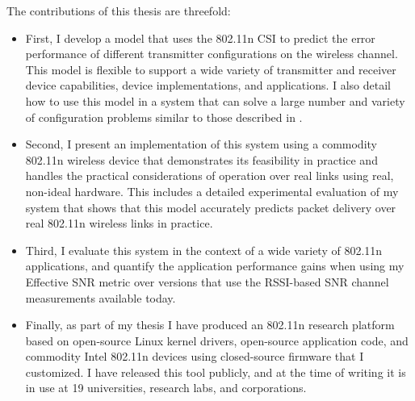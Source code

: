 The contributions of this thesis are threefold:
\begin{itemize}
\item First, I develop a model that uses the 802.11n CSI to predict the error performance of different transmitter configurations on the wireless channel. This model is flexible to support a wide variety of transmitter and receiver device capabilities, device implementations, and applications. I also detail how to use this model in a system that can solve a large number and variety of configuration problems similar to those described in .
\item Second, I present an implementation of this system using a commodity 802.11n wireless device that demonstrates its feasibility in practice and handles the practical considerations of operation over real links using real, non-ideal hardware. This includes a detailed experimental evaluation of my system that shows that this model accurately predicts packet delivery over real 802.11n wireless links in practice.
\item Third, I evaluate this system in the context of a wide variety of 802.11n applications, and quantify the application performance gains when using my Effective SNR metric over versions that use the RSSI-based SNR channel measurements available today.
\item Finally, as part of my thesis I have produced an 802.11n research platform based on open-source Linux kernel drivers, open-source application code, and commodity Intel 802.11n devices using closed-source firmware that I customized.
I have released this tool publicly, and at the time of writing it is in use at 19 universities, research labs, and corporations.
\end{itemize}

